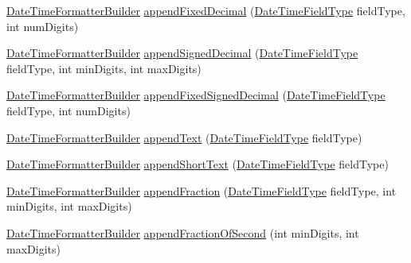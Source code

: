 \begin{DoxyCompactItemize}
\item 
\hyperlink{classorg_1_1joda_1_1time_1_1format_1_1_date_time_formatter_builder}{Date\-Time\-Formatter\-Builder} \hyperlink{classorg_1_1joda_1_1time_1_1format_1_1_date_time_formatter_builder_a6b331ed4107697f6580eaa60628bf317}{append\-Fixed\-Decimal} (\hyperlink{classorg_1_1joda_1_1time_1_1_date_time_field_type}{Date\-Time\-Field\-Type} field\-Type, int num\-Digits)
\item 
\hyperlink{classorg_1_1joda_1_1time_1_1format_1_1_date_time_formatter_builder}{Date\-Time\-Formatter\-Builder} \hyperlink{classorg_1_1joda_1_1time_1_1format_1_1_date_time_formatter_builder_a372825b1be1725f01691c3ddd0a7557d}{append\-Signed\-Decimal} (\hyperlink{classorg_1_1joda_1_1time_1_1_date_time_field_type}{Date\-Time\-Field\-Type} field\-Type, int min\-Digits, int max\-Digits)
\item 
\hyperlink{classorg_1_1joda_1_1time_1_1format_1_1_date_time_formatter_builder}{Date\-Time\-Formatter\-Builder} \hyperlink{classorg_1_1joda_1_1time_1_1format_1_1_date_time_formatter_builder_ab7bd152ff3c5719032b5e79343e850f2}{append\-Fixed\-Signed\-Decimal} (\hyperlink{classorg_1_1joda_1_1time_1_1_date_time_field_type}{Date\-Time\-Field\-Type} field\-Type, int num\-Digits)
\item 
\hyperlink{classorg_1_1joda_1_1time_1_1format_1_1_date_time_formatter_builder}{Date\-Time\-Formatter\-Builder} \hyperlink{classorg_1_1joda_1_1time_1_1format_1_1_date_time_formatter_builder_a53958a0dca304ff8c4000f45352281fd}{append\-Text} (\hyperlink{classorg_1_1joda_1_1time_1_1_date_time_field_type}{Date\-Time\-Field\-Type} field\-Type)
\item 
\hyperlink{classorg_1_1joda_1_1time_1_1format_1_1_date_time_formatter_builder}{Date\-Time\-Formatter\-Builder} \hyperlink{classorg_1_1joda_1_1time_1_1format_1_1_date_time_formatter_builder_af71f80db80c7099f3f20e89082f17689}{append\-Short\-Text} (\hyperlink{classorg_1_1joda_1_1time_1_1_date_time_field_type}{Date\-Time\-Field\-Type} field\-Type)
\item 
\hyperlink{classorg_1_1joda_1_1time_1_1format_1_1_date_time_formatter_builder}{Date\-Time\-Formatter\-Builder} \hyperlink{classorg_1_1joda_1_1time_1_1format_1_1_date_time_formatter_builder_ae7bee6740b3c60e6094a1b1565b709be}{append\-Fraction} (\hyperlink{classorg_1_1joda_1_1time_1_1_date_time_field_type}{Date\-Time\-Field\-Type} field\-Type, int min\-Digits, int max\-Digits)
\item 
\hyperlink{classorg_1_1joda_1_1time_1_1format_1_1_date_time_formatter_builder}{Date\-Time\-Formatter\-Builder} \hyperlink{classorg_1_1joda_1_1time_1_1format_1_1_date_time_formatter_builder_ad1b6b3f7ad25c8b455251e4aa10a4d4b}{append\-Fraction\-Of\-Second} (int min\-Digits, int max\-Digits)

\end{DoxyCompactItemize}
